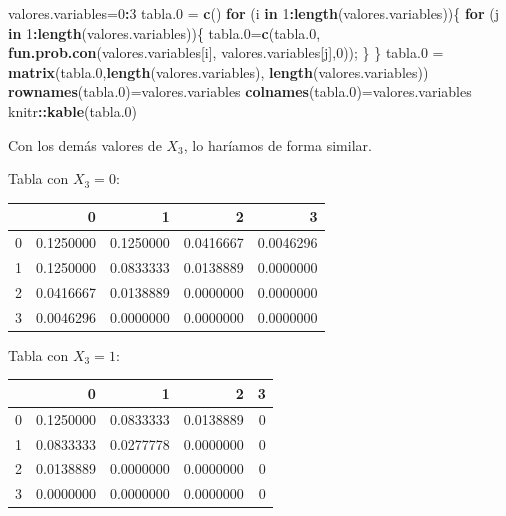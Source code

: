 \documentclass[]{book}
\newenvironment{Shaded}{\begin{snugshade}}{\end{snugshade}}
\newcommand{\ControlFlowTok}[1]{\textcolor[rgb]{0.13,0.29,0.53}{\textbf{#1}}}
\newcommand{\DecValTok}[1]{\textcolor[rgb]{0.00,0.00,0.81}{#1}}
\newcommand{\FloatTok}[1]{\textcolor[rgb]{0.00,0.00,0.81}{#1}}
\newcommand{\KeywordTok}[1]{\textcolor[rgb]{0.13,0.29,0.53}{\textbf{#1}}}
\newcommand{\NormalTok}[1]{#1}
\newcommand{\OperatorTok}[1]{\textcolor[rgb]{0.81,0.36,0.00}{\textbf{#1}}}
\newcommand{\StringTok}[1]{\textcolor[rgb]{0.31,0.60,0.02}{#1}}
\begin{document}
\begin{Shaded}
\begin{Highlighting}[]
\NormalTok{valores.variables=}\DecValTok{0}\OperatorTok{:}\DecValTok{3}
\NormalTok{tabla}\FloatTok{.0}\NormalTok{ =}\StringTok{ }\KeywordTok{c}\NormalTok{()}
\ControlFlowTok{for}\NormalTok{ (i }\ControlFlowTok{in} \DecValTok{1}\OperatorTok{:}\KeywordTok{length}\NormalTok{(valores.variables))\{}
  \ControlFlowTok{for}\NormalTok{ (j }\ControlFlowTok{in} \DecValTok{1}\OperatorTok{:}\KeywordTok{length}\NormalTok{(valores.variables))\{}
\NormalTok{  tabla}\FloatTok{.0}\NormalTok{=}\KeywordTok{c}\NormalTok{(tabla}\FloatTok{.0}\NormalTok{,}
            \KeywordTok{fun.prob.con}\NormalTok{(valores.variables[i],}
\NormalTok{                         valores.variables[j],}\DecValTok{0}\NormalTok{));}
\NormalTok{  \}}
\NormalTok{  \}}
\NormalTok{tabla}\FloatTok{.0}\NormalTok{ =}\StringTok{ }\KeywordTok{matrix}\NormalTok{(tabla}\FloatTok{.0}\NormalTok{,}\KeywordTok{length}\NormalTok{(valores.variables),}
                 \KeywordTok{length}\NormalTok{(valores.variables))}
\KeywordTok{rownames}\NormalTok{(tabla}\FloatTok{.0}\NormalTok{)=valores.variables}
\KeywordTok{colnames}\NormalTok{(tabla}\FloatTok{.0}\NormalTok{)=valores.variables}
\NormalTok{knitr}\OperatorTok{::}\KeywordTok{kable}\NormalTok{(tabla}\FloatTok{.0}\NormalTok{)}
\end{Highlighting}
\end{Shaded}

Con los demás valores de \(X_3\), lo haríamos de forma similar.

Tabla con \(X_3=0\):

\begin{tabular}{l|r|r|r|r}
\hline
  & 0 & 1 & 2 & 3\\
\hline
0 & 0.1250000 & 0.1250000 & 0.0416667 & 0.0046296\\
\hline
1 & 0.1250000 & 0.0833333 & 0.0138889 & 0.0000000\\
\hline
2 & 0.0416667 & 0.0138889 & 0.0000000 & 0.0000000\\
\hline
3 & 0.0046296 & 0.0000000 & 0.0000000 & 0.0000000\\
\hline
\end{tabular}

Tabla con \(X_3=1\):

\begin{tabular}{l|r|r|r|r}
\hline
  & 0 & 1 & 2 & 3\\
\hline
0 & 0.1250000 & 0.0833333 & 0.0138889 & 0\\
\hline
1 & 0.0833333 & 0.0277778 & 0.0000000 & 0\\
\hline
2 & 0.0138889 & 0.0000000 & 0.0000000 & 0\\
\hline
3 & 0.0000000 & 0.0000000 & 0.0000000 & 0\\
\hline
\end{tabular}
\end{document}
